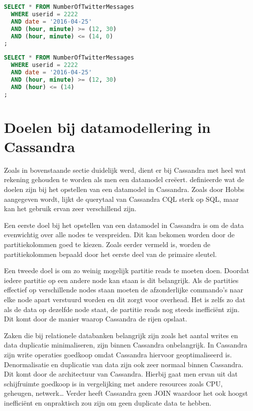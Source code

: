 \begin{lstlisting}[caption={Multi-column slice restrictie}, label={lst:queryMultiCol1}, language=SQL]
SELECT * FROM NumberOfTwitterMessages
  WHERE userid = 2222
  AND date = '2016-04-25'
  AND (hour, minute) >= (12, 30)
  AND (hour, minute) <= (14, 0)
;
\end{lstlisting}

\begin{lstlisting}[caption={De restrictie moet starten met dezelfde kolom}, label={lst:queryMultiCol2}, language=SQL]
SELECT * FROM NumberOfTwitterMessages
  WHERE userid = 2222
  AND date = '2016-04-25'
  AND (hour, minute) >= (12, 30) 
  AND (hour) <= (14)
;
\end{lstlisting}

\section{Doelen bij datamodellering in Cassandra}
Zoals in bovenstaande sectie duidelijk werd, dient er bij Cassandra met heel wat rekening gehouden te worden als men een datamodel creëert.
\cite{Hobbs2015Datamodelling} definieerde wat de doelen zijn bij het opstellen van een datamodel in Cassandra.
Zoals door Hobbs aangegeven wordt, lijkt de querytaal van Cassandra CQL sterk op SQL, maar kan het gebruik ervan zeer verschillend zijn.

Een eerste doel bij het opstellen van een datamodel in Cassandra is om de data evenwichtig over alle nodes te verspreiden.
Dit kan bekomen worden door de partitiekolommen goed te kiezen.
Zoals eerder vermeld is, worden de partitiekolommen bepaald door het eerste deel van de primaire sleutel.

Een tweede doel is om zo weinig mogelijk partitie reads te moeten doen.
Doordat iedere partitie op een andere node kan staan is dit belangrijk.
Als de partities effectief op verschillende nodes staan moeten de afzonderlijke commando's naar elke node apart verstuurd worden en dit zorgt voor overhead.
Het is zelfs zo dat als de data op dezelfde node staat, de partitie reads nog steeds inefficiënt zijn.
Dit komt door de manier waarop Cassandra de rijen opslaat.

Zaken die bij relationele databanken belangrijk zijn zoals het aantal writes en data duplicatie minimaliseren, zijn binnen Cassandra onbelangrijk.
In Cassandra zijn write operaties goedkoop omdat Cassandra hiervoor geoptimaliseerd is.
Denormalisatie en duplicatie van data zijn ook zeer normaal binnen Cassandra.
Dit komt door de architectuur van Cassandra.
Hierbij gaat men ervan uit dat schijfruimte goedkoop is in vergelijking met andere resources zoals CPU, geheugen, netwerk\dots
Verder heeft Cassandra geen JOIN waardoor het ook hoogst inefficiënt en onpraktisch zou zijn om geen duplicate data te hebben.

